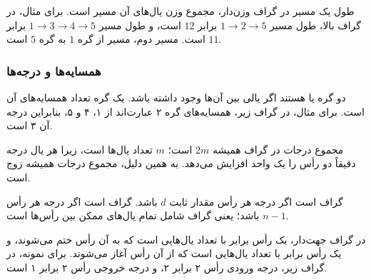 طول یک مسیر در گراف وزن‌دار،
مجموع وزن یال‌های آن مسیر است.
برای مثال، در گراف بالا،
طول مسیر
$1 \rightarrow 2 \rightarrow 5$ برابر $12$ است،
و طول مسیر
$1 \rightarrow 3 \rightarrow 4 \rightarrow 5$ برابر $11$ است.
مسیر دوم،  مسیر از گره $1$ به گره $5$ است.

\subsubsection{همسایه‌ها و درجه‌ها}


دو گره  یا  هستند
اگر یالی بین آن‌ها وجود داشته باشد.
 یک گره
تعداد همسایه‌های آن است.
برای مثال، در گراف زیر،
همسایه‌های گره ۲ عبارت‌اند از ۱، ۴ و ۵،
بنابراین درجه آن ۳ است.

\begin{center}
\end{center}

مجموع درجات در گراف همیشه $2m$ است؛
$m$ تعداد یال‌ها است،
زیرا هر یال
درجه دقیقاً دو رأس را یک واحد افزایش می‌دهد.
به همین دلیل، مجموع درجات همیشه زوج است.


گراف  است اگر
درجه هر رأس مقدار ثابت $d$ باشد.
گراف  است اگر
درجه هر رأس $n-1$ باشد؛ یعنی
گراف شامل تمام یال‌های ممکن
بین رأس‌ها است.


در گراف جهت‌دار، 
یک رأس برابر با تعداد یال‌هایی است
که به آن رأس ختم می‌شوند،
و  یک رأس
برابر با تعداد یال‌هایی است که از آن رأس آغاز می‌شوند.
برای نمونه، در گراف زیر،
درجه ورودی رأس ۲ برابر ۲،
و درجه خروجی رأس ۲ برابر ۱ است.

\begin{center}
\end{center}

